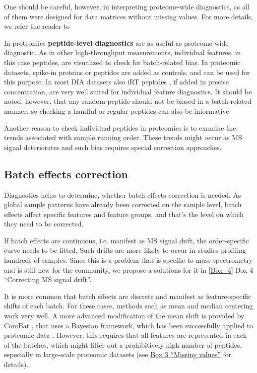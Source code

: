 \documentclass[num-refs]{wiley-article}
\begin{document}
One should be careful, however, in interpreting proteome-wide diagnostics, as all of them were designed for data matrices without missing values. For more details, we refer the reader to %

In proteomics \textbf{peptide-level diagnostics} are as useful as proteome-wide diagnostic. As in other high-throughput measurements, individual features, in this case peptides, are visualized to check for batch-related bias. In proteomic datasets, spike-in proteins or peptides are added as controls, and can be used for this purpose. In most DIA datasets also iRT peptides \cite{Escher:2012aa}, if added in precise concentration, are very well suited for individual feature diagnostics.
It should be noted, however, that any random peptide should not be biased in a batch-related manner, so checking a handful or regular peptides can also be informative.

Another reason to check individual peptides in proteomics is to examine the trends associated with sample running order. These trends might occur as MS signal deteriorates and such bias requires special correction approaches.

\subsection{Batch effects correction}
Diagnostics helps to determine, whether batch effects correction is needed. As global sample patterns have already been corrected on the sample level, batch effects affect specific features and feature groups, and that’s the level on which they need to be corrected.

If batch effects are continuous, i.e. manifest as MS signal drift, the order-specific curve needs to be fitted. Such drifts are more likely to occur in studies profiling hundreds of samples. Since this is a problem that is specific to mass spectrometry and is still new for the community, we propose a solutions for it in  \ref{Box_4} Box 4 “Correcting MS signal drift”.

It is more common that batch effects are discrete and manifest as feature-specific shifts of each batch. For these cases, methods such as mean and median centering work very well. A more advanced modification of the mean shift is provided by ComBat \cite{Johnson:2007aa}, that uses a Bayesian framework, which has been successfully applied to proteomic data \cite{Lee:2019aa}. However, this requires that all features are represented in each of the batches, which might filter out a prohibitively high number of peptides, especially in large-scale proteomic datasets (see \hyperref[box:Box3_missingness]{Box 3 “Missing values”} for details).
\end{document}
